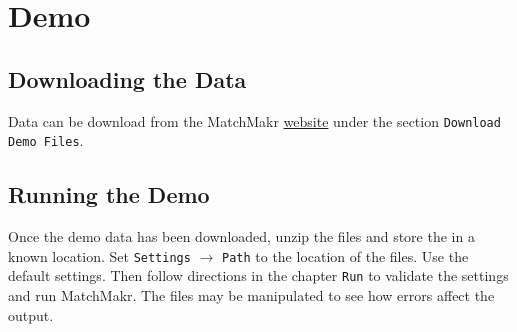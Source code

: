 \chapter{Demo}

\section{Downloading the Data}

Data can be download from the MatchMakr \href{\website}{website} under the section \texttt{Download Demo Files}.

\section{Running the Demo}

Once the demo data has been downloaded, unzip the files and store the in a known location.  Set \texttt{Settings} $\rightarrow$ \texttt{Path} to the location of the files.  Use the default settings.  Then follow directions in the chapter \texttt{Run} to validate the settings and run MatchMakr.  The files may be manipulated to see how errors affect the output.